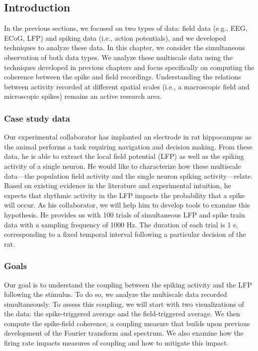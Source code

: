 \documentclass[11pt]{article}
\begin{document}
    \subsection{Introduction}\label{introduction}

In the previous sections, we focused on two types of data: field data
(e.g., EEG, ECoG, LFP) and spiking data (i.e., action potentials), and
we developed techniques to analyze these data. In this chapter, we
consider the simultaneous observation of both data types. We analyze
these multiscale data using the techniques developed in previous
chapters and focus specifically on computing the coherence between the
spike and field recordings. Understanding the relations between activity
recorded at different spatial scales (i.e., a macroscopic field and
microscopic spikes) remains an active research area.

\subsubsection{Case study data}\label{case-study-data}

Our experimental collaborator has implanted an electrode in rat
hippocampus as the animal performs a task requiring navigation and
decision making. From these data, he is able to extract the local field
potential (LFP) as well as the spiking activity of a single neuron. He
would like to characterize how these multiscale data---the population
field activity and the single neuron spiking activity---relate. Based on
existing evidence in the literature and experimental intuition, he
expects that rhythmic activity in the LFP impacts the probability that a
spike will occur. As his collaborator, we will help him to develop tools
to examine this hypothesis. He provides us with 100 trials of
simultaneous LFP and spike train data with a sampling frequency of 1000
Hz. The duration of each trial is 1 s, corresponding to a fixed temporal
interval following a particular decision of the rat.

\subsubsection{Goals}\label{goals}

Our goal is to understand the coupling between the spiking activity and
the LFP following the stimulus. To do so, we analyze the multiscale data
recorded simultaneously. To assess this coupling, we will start with two
visualizations of the data: the spike-triggered average and the
field-triggered average. We then compute the spike-field coherence, a
coupling measure that builds upon previous development of the Fourier
transform and spectrum. We also examine how the firing rate impacts
measures of coupling and how to mitigate this impact.
\end{document}
